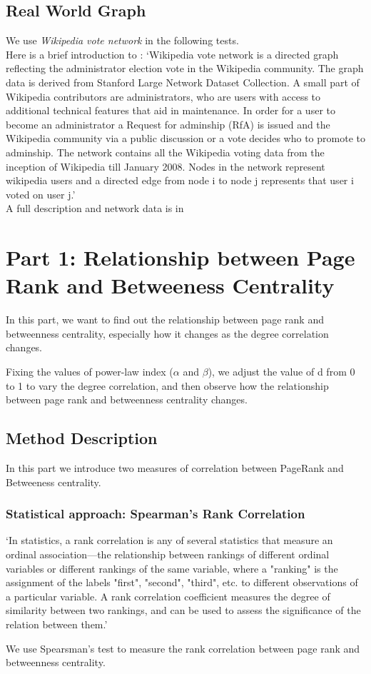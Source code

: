 \documentclass{article}
\begin{document}
\subsection{Real World Graph}
We use \emph{Wikipedia vote network} in the following tests. \\
\hypertarget{wikivote_intro}{Here is a brief introduction to :}
`Wikipedia vote network is a directed graph reflecting the administrator election vote in the Wikipedia community. The graph data is derived from Stanford Large Network Dataset Collection. A small part of Wikipedia contributors are administrators, who are users with access to additional technical features that aid in maintenance. In order for a user to become an administrator a Request for adminship (RfA) is issued and the Wikipedia community via a public discussion or a vote decides who to promote to adminship. The network contains all the Wikipedia voting data from the inception of Wikipedia till January 2008. Nodes in the network represent wikipedia users and a directed edge from node i to node j represents that user i voted on user j.'\\
A full description and network data is in \cite{wikivote_source}


\section{Part 1: Relationship between Page Rank and Betweeness Centrality}
\par In this part, we want to find out the relationship between page rank and betweenness centrality, especially how it changes as the degree correlation changes.\par Fixing the values of power-law index ($\alpha$ and $\beta$), we adjust the value of d from 0 to 1 to vary the degree correlation, and then observe how the relationship between page rank and betweenness centrality changes.
\subsection{Method Description}
In this part we introduce two measures of correlation between PageRank and Betweeness centrality.
\subsubsection{Statistical approach: Spearman's Rank Correlation }
\par `In statistics, a rank correlation is any of several statistics that measure an ordinal association—the relationship between rankings of different ordinal variables or different rankings of the same variable, where a "ranking" is the assignment of the labels "first", "second", "third", etc. to different observations of a particular variable. A rank correlation coefficient measures the degree of similarity between two rankings, and can be used to assess the significance of the relation between them.' \cite{spearman} 
\par We use Spearsman's test to measure the rank correlation between page rank and betweenness centrality.
\end{document}
